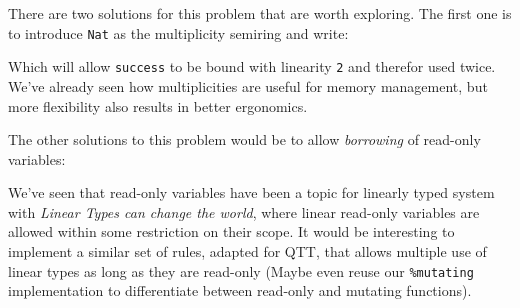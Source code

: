 \documentclass[
]{article}
\newenvironment{Shaded}{}{}
\newcommand{\CommentTok}[1]{\textcolor[rgb]{0.38,0.63,0.69}{\textit{#1}}}
\newcommand{\DataTypeTok}[1]{\textcolor[rgb]{0.56,0.13,0.00}{#1}}
\newcommand{\DecValTok}[1]{\textcolor[rgb]{0.25,0.63,0.44}{#1}}
\newcommand{\FunctionTok}[1]{\textcolor[rgb]{0.02,0.16,0.49}{#1}}
\newcommand{\KeywordTok}[1]{\textcolor[rgb]{0.00,0.44,0.13}{\textbf{#1}}}
\newcommand{\NormalTok}[1]{#1}
\newcommand{\OperatorTok}[1]{\textcolor[rgb]{0.40,0.40,0.40}{#1}}
\newcommand{\OtherTok}[1]{\textcolor[rgb]{0.00,0.44,0.13}{#1}}
\newcommand{\StringTok}[1]{\textcolor[rgb]{0.25,0.44,0.63}{#1}}
\begin{document}
There are two solutions for this problem that are worth exploring. The
first one is to introduce \texttt{Nat} as the multiplicity semiring and
write:

\begin{Shaded}
\end{Shaded}

Which will allow \texttt{success} to be bound with linearity \texttt{2}
and therefor used twice. We've already seen how multiplicities are
useful for memory management, but more flexibility also results in
better ergonomics.

The other solutions to this problem would be to allow \emph{borrowing}
of read-only variables:

\begin{Shaded}
\end{Shaded}

We've seen that read-only variables have been a topic for linearly typed
system with \emph{Linear Types can change the
world}\cite{linear_types_update}, where linear read-only variables are
allowed within some restriction on their scope. It would be interesting
to implement a similar set of rules, adapted for QTT, that allows
multiple use of linear types as long as they are read-only (Maybe even
reuse our \texttt{\%mutating} implementation to differentiate between
read-only and mutating functions).
\end{document}
